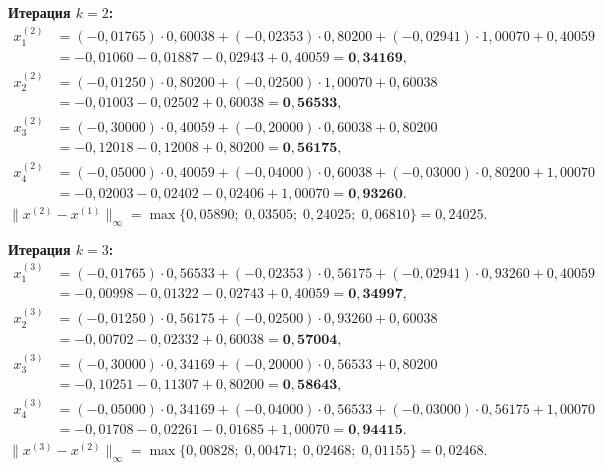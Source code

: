 \documentclass[a4paper, final]{article}
\begin{document}
\medskip\textbf{Итерация $k=2$:}
\begin{align*}
x_1^{(2)} &= (-0{,}01765)\cdot0{,}60038 + (-0{,}02353)\cdot0{,}80200 + (-0{,}02941)\cdot1{,}00070 + 0{,}40059\\
           &= -0{,}01060 - 0{,}01887 - 0{,}02943 + 0{,}40059 = \mathbf{0{,}34169},\\
x_2^{(2)} &= (-0{,}01250)\cdot0{,}80200 + (-0{,}02500)\cdot1{,}00070 + 0{,}60038\\
           &= -0{,}01003 - 0{,}02502 + 0{,}60038 = \mathbf{0{,}56533},\\
x_3^{(2)} &= (-0{,}30000)\cdot0{,}40059 + (-0{,}20000)\cdot0{,}60038 + 0{,}80200\\
           &= -0{,}12018 - 0{,}12008 + 0{,}80200 = \mathbf{0{,}56175},\\
x_4^{(2)} &= (-0{,}05000)\cdot0{,}40059 + (-0{,}04000)\cdot0{,}60038 + (-0{,}03000)\cdot0{,}80200 + 1{,}00070\\
           &= -0{,}02003 - 0{,}02402 - 0{,}02406 + 1{,}00070 = \mathbf{0{,}93260}.
\end{align*}
$\|x^{(2)}-x^{(1)}\|_\infty = \max\{0{,}05890;\;0{,}03505;\;0{,}24025;\;0{,}06810\} = 0{,}24025.$

\medskip\textbf{Итерация $k=3$:}
\begin{align*}
x_1^{(3)} &= (-0{,}01765)\cdot0{,}56533 + (-0{,}02353)\cdot0{,}56175 + (-0{,}02941)\cdot0{,}93260 + 0{,}40059\\
           &= -0{,}00998 - 0{,}01322 - 0{,}02743 + 0{,}40059 = \mathbf{0{,}34997},\\
x_2^{(3)} &= (-0{,}01250)\cdot0{,}56175 + (-0{,}02500)\cdot0{,}93260 + 0{,}60038\\
           &= -0{,}00702 - 0{,}02332 + 0{,}60038 = \mathbf{0{,}57004},\\
x_3^{(3)} &= (-0{,}30000)\cdot0{,}34169 + (-0{,}20000)\cdot0{,}56533 + 0{,}80200\\
           &= -0{,}10251 - 0{,}11307 + 0{,}80200 = \mathbf{0{,}58643},\\
x_4^{(3)} &= (-0{,}05000)\cdot0{,}34169 + (-0{,}04000)\cdot0{,}56533 + (-0{,}03000)\cdot0{,}56175 + 1{,}00070\\
           &= -0{,}01708 - 0{,}02261 - 0{,}01685 + 1{,}00070 = \mathbf{0{,}94415}.
\end{align*}
$\|x^{(3)}-x^{(2)}\|_\infty = \max\{0{,}00828;\;0{,}00471;\;0{,}02468;\;0{,}01155\} = 0{,}02468.$
\end{document}

